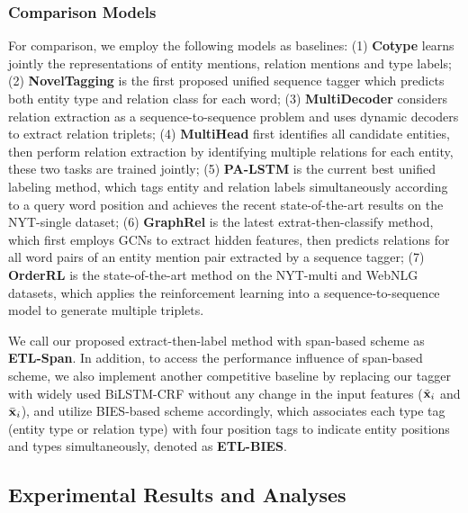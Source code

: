 \documentclass{ecai}
\begin{document}
\subsubsection{Comparison Models}

For comparison, we employ the following models as baselines: 
(1) \textbf{Cotype} \cite{ren2017cotype} learns jointly the representations of entity mentions, relation mentions and type labels;
(2) \textbf{NovelTagging} \cite{zheng2017joint} is the first proposed unified sequence tagger which predicts both entity type and relation class for each word; 
(3) \textbf{MultiDecoder} \cite{zeng2018extracting} considers relation extraction as a sequence-to-sequence problem and uses dynamic decoders to extract relation triplets; 
(4) \textbf{MultiHead} \cite{bekoulis2018joint} first identifies all candidate entities, then perform relation extraction by identifying multiple relations for each entity, these two tasks are trained jointly;
(5) \textbf{PA-LSTM} \cite{dai2019joint} is the current best unified labeling method, which tags entity and relation labels simultaneously according to a query word position and achieves the recent state-of-the-art results on the NYT-single dataset; 
(6) \textbf{GraphRel} \cite{fu-etal-2019-graphrel} is the latest extrat-then-classify method, which first employs GCNs to extract hidden features, then predicts relations for all word pairs of an entity mention pair extracted by a sequence tagger;
(7) \textbf{OrderRL} \cite{zeng-etal-2019-learning} is the state-of-the-art method on the NYT-multi and WebNLG datasets, which applies the reinforcement learning into a sequence-to-sequence model to generate multiple triplets.


We call our proposed extract-then-label method with span-based scheme as \textbf{ETL-Span}. 
In addition, to access the performance influence of span-based scheme, we also implement another competitive baseline by replacing our tagger with widely used BiLSTM-CRF without any change in the input features ($\tilde{\boldsymbol{\rm{x}}}_i$ and $\bar{\boldsymbol{\rm{x}}}_i$), and utilize BIES-based scheme accordingly, which associates each type tag (entity type or relation type) with four position tags to indicate entity positions and types simultaneously, denoted as \textbf{ETL-BIES}. 


\subsection{Experimental Results and Analyses}
\end{document}
